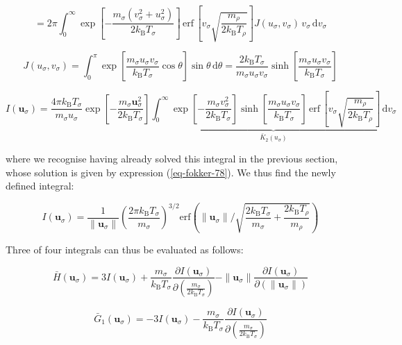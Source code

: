 \begin{equation}
    =2\pi\int_0^\infty\exp{\left[-\frac{m_\sigma(v_\sigma^2+u_\sigma^2)}{2k_\mathrm{B}T_\sigma}\right]}\,\text{erf}\,\left[v_\sigma\sqrt{\frac{m_\rho}{2k_\mathrm{B}T_\rho}}\right]J(u_\sigma, v_\sigma)\,v_\sigma\,\mathrm{d}v_\sigma
\end{equation}

\begin{equation}
    J(u_\sigma,v_\sigma)=\int_0^\pi\exp{\left[\frac{m_\sigma u_\sigma v_\sigma}{k_\mathrm{B}T_\sigma}\cos{\theta}\right]}\sin{\theta}\,\mathrm{d}\theta=\frac{2k_\mathrm{B}T_\sigma}{m_\sigma u_\sigma v_\sigma}\sinh{\left[\frac{m_\sigma u_\sigma v_\sigma}{k_\mathrm{B}T_\sigma}\right]}
\end{equation}

\begin{equation}
    I(\mathbf{u}_\sigma)=\frac{4\pi k_\mathrm{B}T_\sigma}{m_\sigma u_\sigma}\exp{\left[-\frac{m_\sigma\mathbf{u}_\sigma^2}{2k_\mathrm{B}T_\sigma}\right]}\underbrace{\int_0^\infty\exp{\left[-\frac{m_\sigma v_\sigma^2}{2k_\mathrm{B}T_\sigma}\right]}\sinh{\left[\frac{m_\sigma u_\sigma v_\sigma}{k_\mathrm{B}T_\sigma}\right]}\,\text{erf}\,\left[v_\sigma\sqrt{\frac{m_\rho}{2k_\mathrm{B}T_\rho}}\right]\,\mathrm{d}v_\sigma}_{\bar{K}_2(u_\sigma)}
\end{equation}

where we recognise having already solved this integral in the previous section, whose solution is given by expression (\ref{eq-fokker-78}). We thus find the newly defined integral:

\begin{equation}
    I(\mathbf{u}_\sigma)=\frac{1}{\|\mathbf{u}_\sigma\|}\left(\frac{2\pi k_\mathrm{B}T_\sigma}{m_\sigma}\right)^{3/2}\text{erf}\left(\|\mathbf{u}_\sigma\|\bigg/{\sqrt{\frac{2k_\mathrm{B}T_\sigma}{m_\sigma}+\frac{2k_\mathrm{B}T_\rho}{m_\rho}}}\right)
\end{equation}

Three of four integrals can thus be evaluated as follows:

\begin{equation}
    \bar{H}(\mathbf{u}_\sigma)=3I(\mathbf{u}_\sigma)+\frac{m_\sigma}{k_\mathrm{B}T_\sigma}\frac{\partial I(\mathbf{u}_\sigma)}{\partial(\frac{m_\sigma}{2k_\mathrm{B}T_\sigma})}-\|\mathbf{u}_\sigma\|\frac{\partial I(\mathbf{u}_\sigma)}{\partial(\|\mathbf{u}_\sigma\|)}
\end{equation}

\begin{equation}
    \bar{G}_1(\mathbf{u}_\sigma)=-3I(\mathbf{u}_\sigma)-\frac{m_\sigma}{k_\mathrm{B}T_\sigma}\frac{\partial I(\mathbf{u}_\sigma)}{\partial\left(\frac{m_\sigma}{2k_\mathrm{B}T_\sigma}\right)}
\end{equation}

